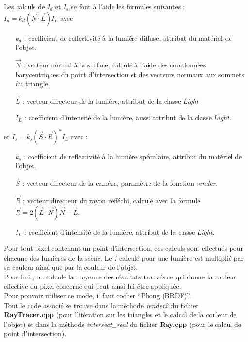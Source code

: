 \documentclass[a4paper,11pt,titlepage]{article}
\begin{document}
Les calculs de $I_d$ et $I_s$ se font à l'aide les formules suivantes : \\
$I_d = k_d(\vec N \cdot \vec L)I_L$ avec 
\begin{itemize}
 \item[$k_d$ :] coefficient de reflectivité à la lumière diffuse, attribut du matériel de l'objet.
 \item[$\vec N$ :] vecteur normal à la surface, calculé à l'aide des coordonnées barycentriques du point d'intersection et des vecteurs normaux aux sommets du triangle.
 \item[$\vec L$ :] vecteur directeur de la lumière, attribut de la classe \textit{Light}
 \item[$I_L$ :] coefficient d'intensité de la lumière, aussi attribut de la classe \textit{Light}.\\
\end{itemize}
et $I_s = k_s(\vec S \cdot \vec R)^nI_L$ avec : 
\begin{itemize}
 \item[$k_s$ :] coefficient de reflectivité à la lumière spéculaire, attribut du matériel de l'objet.
 \item[$\vec S$ :] vecteur directeur de la caméra, paramètre de la fonction \textit{render}.
 \item[$\vec R$ :] vecteur directeur du rayon réfléchi, calculé avec la formule\\ $\vec R = 2(\vec L \cdot \vec N)\vec N - \vec L$.
 \item[$I_L$ :] coefficient d'intensité de la lumière, attribut de la classe \textit{Light}.\\
\end{itemize}


Pour tout pixel contenant un point d'intersection, ces calculs sont effectués pour chacune des lumières de la scène. Le $I$ calculé pour une lumière est multiplié par sa couleur ainsi que par la couleur de l'objet.\\
Pour finir, on calcule la moyenne des résultats trouvés ce qui donne la couleur effective du pixel concerné qui peut ainsi lui être appliquée.\\

Pour pouvoir utiliser ce mode, il faut cocher ``Phong (BRDF)''.\\

Tout le code associé se trouve dans la méthode \textit{render2} du fichier \textbf{RayTracer.cpp} (pour l'itération sur les triangles et le calcul de la couleur de l'objet) et dans la méthode \textit{intersect\_real} du fichier \textbf{Ray.cpp} (pour le calcul de point d'intersection).
\end{document}
